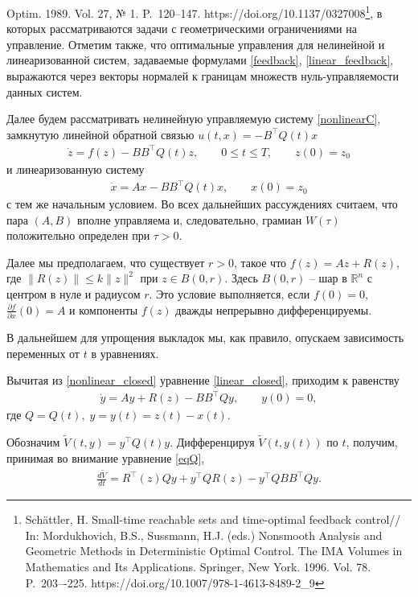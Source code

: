 \documentclass[../main.tex]{subfiles}
\begin{document}
{	Optim. 1989. Vol. 27, № 1. P.~120--147. https://doi.org/10.1137/0327008}\footnote{Sch\"{a}ttler, H. Small-time reachable sets and time-optimal feedback control// In: Mordukhovich, B.S.,
	Sussmann, H.J. (eds.) Nonsmooth Analysis and Geometric Methods in Deterministic Optimal Control.
	The IMA Volumes in Mathematics and Its Applications. Springer, New York. 1996. Vol. 78. P.~203–-225. https://doi.org/10.1007/978-1-4613-8489-2\_9}, в которых  рассматриваются задачи с геометрическими ограничениями на управление. Отметим также, что  оптимальные  управления для нелинейной и линеаризованной систем, задаваемые формулами \eqref{feedback}, \eqref{linear_feedback}, выражаются через векторы  нормалей к границам множеств нуль-управляемости данных систем. 
	
	Далее будем рассматривать нелинейную управляемую систему \eqref{nonlinearC}, замкнутую линейной обратной связью $u(t,x) = - B^{\top}Q(t) x$ 
	\begin{gather}\label{nonlinear_closed}
		\dot{z} = f(z) - B B^{\top} Q(t) z, \qquad 0 \leqslant t \leqslant T, \qquad z(0) = z_0
	\end{gather}
	и линеаризованную систему 
	\begin{gather}\label{linear_closed}
		\dot{x} = A x - B B^{\top} Q(t) x, \qquad x(0)=z_0
	\end{gather}
	с тем же начальным условием. Во всех дальнейших рассуждениях считаем, что пара $(A,B)$ вполне управляема и, следовательно, грамиан $W(\tau)$ положительно определен при $\tau >0$.
	
	Далее мы предполагаем, что существует $r>0$, такое что  $ f(z) = Az + R(z) $, где $ \|R(z) \| \leqslant k \| z\|^2  $ при $ z \in B(0,r) $. Здесь $ B(0,r) $ -- шар в $ \mathbb{R}^n $ с центром в нуле и радиусом $ r $. Это  условие выполняется, если $ f(0) = 0 $, $ \frac{\partial f}{\partial x}(0) = A $ и компоненты $ f(z) $ дважды непрерывно дифференцируемы.
	
	В дальнейшем для упрощения  выкладок  мы, как правило, опускаем зависимость переменных от $t$ в уравнениях.
	
	Вычитая из \eqref{nonlinear_closed} уравнение \eqref{linear_closed}, приходим к равенству
	\begin{gather*}
		\dot{y} = A y + R(z) - B B^{\top} Q y, \qquad y(0) =0, 
	\end{gather*}
	где $Q=Q(t),\; y=y(t) = z(t) - x(t) $. 
	
	Обозначим $ \widetilde{V}(t,y) = y^{\top} Q(t) y $. Дифференцируя $ \widetilde{V}(t,y(t))$ по $t$,  получим, принимая во внимание уравнение \eqref{eqQ},
	\begin{gather}\label{dV}
		\frac{d\widetilde{V}}{dt} = R^{\top}(z) Q y + y^{\top} Q R(z) - y^{\top} Q B B^{\top} Q y. 
	\end{gather}
	
\end{document}
